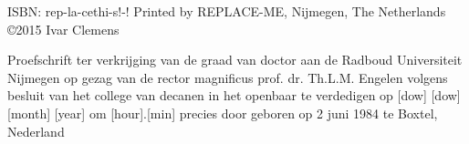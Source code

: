 \begin{titlepage}

\fontsize{12pt}{14pt}\selectfont

\qquad

\fontsize{17.28pt}{21pt}\selectfont

\noindent \concept{\thesistitle}
\fontsize{15.28pt}{20pt}\selectfont
 \npar \noindent \thesissubtitle

\fontsize{12pt}{14pt}\selectfont

\vspace{1cm}

\noindent {}

\vspace{3cm}

\end{titlepage}

\thispagestyle{empty}


\clearpage
\thispagestyle{empty}
	
\null
\vfill
\noindent ISBN: rep-la-cethi-s!-!
\npar
\noindent Printed by REPLACE-ME, Nijmegen, The Netherlands
\npar
\noindent \copyright 2015 Ivar Clemens %



\begin{titlepage}

\fontsize{12pt}{14pt}\selectfont
\vspace*{\fill}
\begin{center}

\fontsize{17.28pt}{21pt}\selectfont

{\textsc{\MakeUppercase{\thesistitle}}}
 \npar \MakeUppercase{\thesissubtitle}

\fontsize{12pt}{14pt}\selectfont

\vspace{1cm}
Proefschrift
\vspace{1cm}
\npar
ter verkrijging van de graad van doctor
\npar
aan de Radboud Universiteit Nijmegen
\npar
op gezag van de rector magnificus prof. dr. Th.L.M. Engelen
\npar
volgens besluit van het college van decanen
\npar
in het openbaar te verdedigen op [dow] [dow] [month] [year]
\npar
om [hour].[min] precies
\npar
\vspace{1cm}
door
\npar
\vspace{1cm}
\npar
geboren op 2 juni 1984
\npar
te Boxtel, Nederland

\vspace{2.8cm}

\fontsize{17.28pt}{21pt}\selectfont

\end{center}
\end{titlepage}

